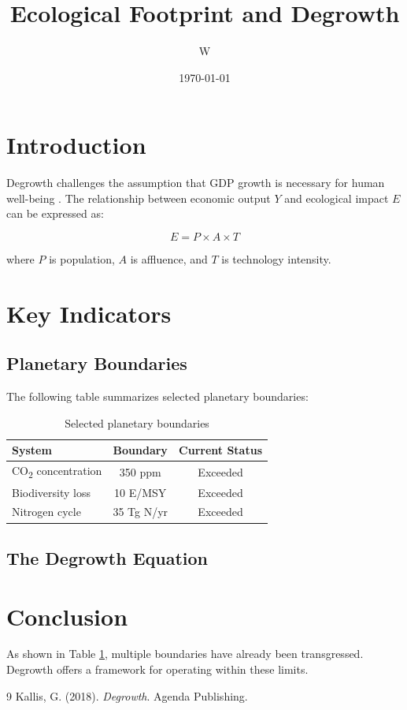 \documentclass[12pt, a4paper]{article}
\title{Ecological Footprint and Degrowth}
\author{W}
\date{\today}
\begin{document}
\maketitle

\tableofcontents

\section{Introduction}
Degrowth challenges the assumption that GDP growth is necessary for human well-being \cite{kallis2018}. The relationship between economic output $Y$ and ecological impact $E$ can be expressed as:

\begin{equation}
    E = P \times A \times T
\end{equation}

where $P$ is population, $A$ is affluence, and $T$ is technology intensity.

\section{Key Indicators}

\subsection{Planetary Boundaries}
The following table summarizes selected planetary boundaries:

\begin{table}[h]
\centering
\begin{tabular}{lcc}
\toprule
\textbf{System} & \textbf{Boundary} & \textbf{Current Status} \\
\midrule
CO\textsubscript{2} concentration & 350 ppm & Exceeded \\
Biodiversity loss & 10 E/MSY & Exceeded \\
Nitrogen cycle & 35 Tg N/yr & Exceeded \\
\bottomrule
\end{tabular}
\caption{Selected planetary boundaries}
\label{tab:boundaries}
\end{table}

\subsection{The Degrowth Equation}


\section{Conclusion}
As shown in Table \ref{tab:boundaries}, multiple boundaries have already been transgressed. Degrowth offers a framework for operating within these limits.

\begin{thebibliography}{9}
Kallis, G. (2018). \textit{Degrowth}. Agenda Publishing.
\end{thebibliography}
\end{document}
